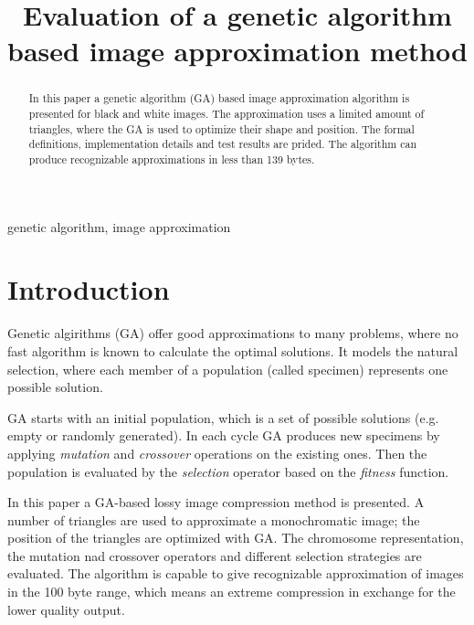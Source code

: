\documentclass[conference]{IEEEtran}
\begin{document}
\title{Evaluation of a genetic algorithm based image approximation method}

\author{
}

\maketitle

\begin{abstract}
In this paper a genetic algorithm (GA) based image approximation
algorithm is presented for black and white images. The approximation
uses a limited amount of triangles, where the GA is used to
optimize their shape and position. The formal definitions,
implementation details and test results are prided. The
algorithm can produce recognizable approximations in less
than 139 bytes.
\end{abstract}

\begin{IEEEkeywords}
genetic algorithm, image approximation
\end{IEEEkeywords}

\section{Introduction}

Genetic algirithms (GA) \cite{ga-book} offer good approximations to many
problems, where no fast algorithm is known to calculate
the optimal solutions. It models the natural selection,
where each member of a population (called specimen)
represents one possible solution.

GA starts with an initial population, which is a set of
possible solutions (e.g. empty or randomly generated).
In each cycle GA produces new specimens by applying
\emph{mutation} and \emph{crossover} operations on the
existing ones. Then the population is evaluated by
the \emph{selection} operator based on the \emph{fitness}
function.

In this paper a GA-based lossy image compression method is
presented. A number of triangles are used to approximate
a monochromatic image; the position of the triangles are
optimized with GA. The chromosome representation, the
mutation nad crossover operators and different selection
strategies are evaluated. The algorithm is capable to give
recognizable approximation of images in the 100 byte range,
which means an extreme compression in exchange for the
lower quality output.
\end{document}
